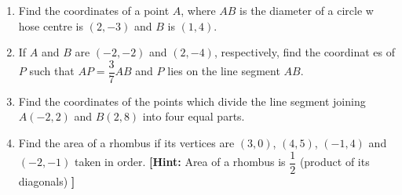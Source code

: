 \documentclass[a4paper,12pt]{article}
\begin{document}
\begin{enumerate}[leftmargin=*]
\item Find the coordinates of a point $A$, where $AB$ is the diameter of a circle w
hose centre is $(2, -3)$ and $B$ is $(1, 4)$.

\item If $A$ and $B$ are $(-2, -2)$ and $(2, -4)$, respectively, find the coordinat
es of $P$ such that $AP = \dfrac{3}{7} AB$ and $P$ lies on the line segment $AB$.                                                                                     \item Find the coordinates of the points which divide the line segment joining $A(-2, 2)$ and $B(2, 8)$ into four equal parts.
                                                                                   \item Find the area of a rhombus if its vertices are $(3, 0)$, $(4, 5)$, $(-1, 4)$ and $(-2, -1)$ taken in order. \textbf{[Hint:} Area of a rhombus is $\dfrac{1}{2}$
(product of its diagonals) \textbf{]}

\end{enumerate}                                                                                                                                                       
\end{document}
